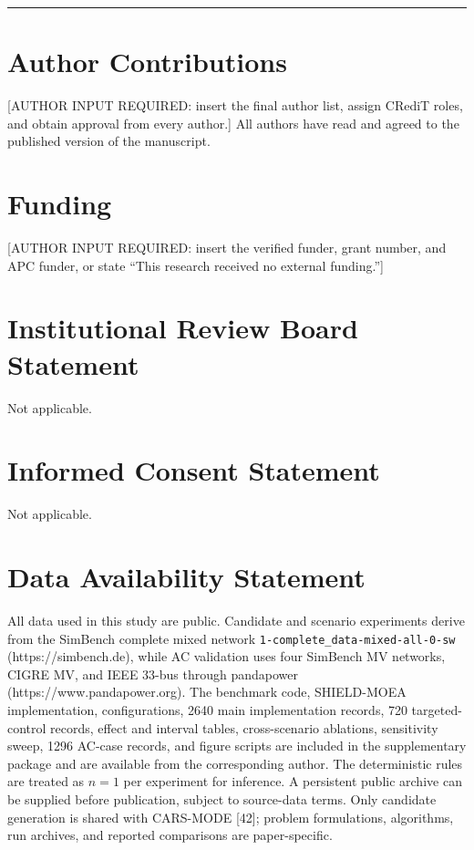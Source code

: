 \documentclass[
  10pt,
  a4paper,
]{article}
\begin{document}
\begin{center}\rule{0.5\linewidth}{0.5pt}\end{center}

\section{Author Contributions}\label{author-contributions}

{[}AUTHOR INPUT REQUIRED: insert the final author list, assign CRediT
roles, and obtain approval from every author.{]} All authors have read
and agreed to the published version of the manuscript.

\section{Funding}\label{funding}

{[}AUTHOR INPUT REQUIRED: insert the verified funder, grant number, and
APC funder, or state ``This research received no external funding.''{]}

\section{Institutional Review Board
Statement}\label{institutional-review-board-statement}

Not applicable.

\section{Informed Consent Statement}\label{informed-consent-statement}

Not applicable.

\section{Data Availability Statement}\label{data-availability-statement}

All data used in this study are public. Candidate and scenario
experiments derive from the SimBench complete mixed network
\texttt{1-complete\_data-mixed-all-0-sw} (https://simbench.de), while AC
validation uses four SimBench MV networks, CIGRE MV, and IEEE 33-bus
through pandapower (https://www.pandapower.org). The benchmark code,
SHIELD-MOEA implementation, configurations, 2640 main implementation
records, 720 targeted-control records, effect and interval tables,
cross-scenario ablations, sensitivity sweep, 1296 AC-case records, and
figure scripts are included in the supplementary package and are
available from the corresponding author. The deterministic rules are
treated as \(n=1\) per experiment for inference. A persistent public
archive can be supplied before publication, subject to source-data
terms. Only candidate generation is shared with CARS-MODE {[}42{]};
problem formulations, algorithms, run archives, and reported comparisons
are paper-specific.
\end{document}
